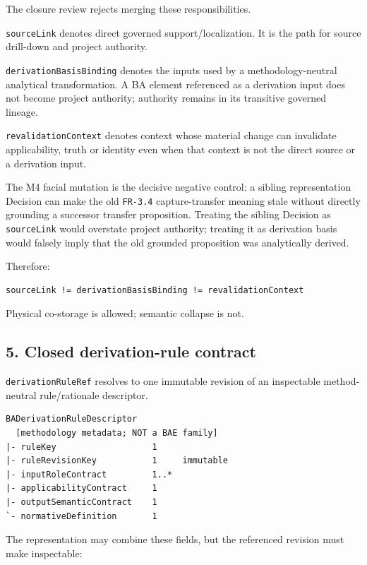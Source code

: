 \documentclass[11pt,a4paper]{article}
\begin{document}
The closure review rejects merging these responsibilities.

\texttt{sourceLink} denotes direct governed support/localization. It is the path for source drill-down and project authority.

\texttt{derivationBasisBinding} denotes the inputs used by a methodology-neutral analytical transformation. A BA element referenced as a derivation input does not become project authority; authority remains in its transitive governed lineage.

\texttt{revalidationContext} denotes context whose material change can invalidate applicability, truth or identity even when that context is not the direct source or a derivation input.

The M4 facial mutation is the decisive negative control: a sibling representation Decision can make the old \texttt{FR-3.4} capture-transfer meaning stale without directly grounding a successor transfer proposition. Treating the sibling Decision as \texttt{sourceLink} would overstate project authority; treating it as derivation basis would falsely imply that the old grounded proposition was analytically derived.

Therefore:

\begin{verbatim}
sourceLink != derivationBasisBinding != revalidationContext
\end{verbatim}

Physical co-storage is allowed; semantic collapse is not.

\subsection{5. Closed derivation-rule contract}\label{closed-derivation-rule-contract}

\texttt{derivationRuleRef} resolves to one immutable revision of an inspectable method-neutral rule/rationale descriptor.

\begin{verbatim}
BADerivationRuleDescriptor
  [methodology metadata; NOT a BAE family]
|- ruleKey                   1
|- ruleRevisionKey           1     immutable
|- inputRoleContract         1..*
|- applicabilityContract     1
|- outputSemanticContract    1
`- normativeDefinition       1
\end{verbatim}

The representation may combine these fields, but the referenced revision must make inspectable:
\end{document}
